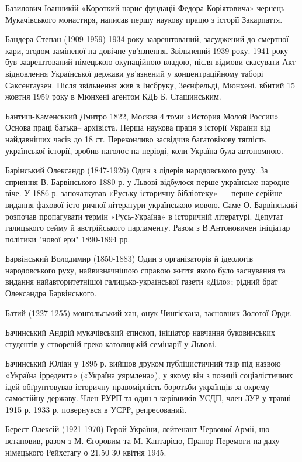 Базилович Іоанникій «Короткий нарис фундації Федора Коріятовича» чернець Мукачівського монастиря, написав першу наукову працю з історії Закарпаття.

Бандера Степан (1909-1959) 1934 року заарештований, засуджений до смертної кари, згодом заміненої на довічне ув'язнення. Звільнений 1939 року. 1941 року був заарештований німецькою окупаційною владою, після відмови скасувати Акт відновлення Української держави ув'язнений у концентраційному таборі Саксенгаузен. Після звільнення жив в Інсбруку, Зеєнфельді, Мюнхені. вбитий 15 жовтня 1959 року в Мюнхені агентом КДБ Б. Сташинським. 

Бантиш-Каменський Дмитро 1822, Москва 4 томи «История Молой России» Основа праці батька– архівіста. Перша наукова праця з історії України від найдавніших часів до 18 ст. Переконливо засвідчив багатовікову тяглість української історії, зробив наголос на періоді, коли Україна була автономною.

Барінський Олександр (1847-1926) Один з лідерів народовського руху. За сприяння В. Барвінського 1880 р. у Львові відбулося перше українське народне віче. У 1886 р. започаткував «Руську історичну бібліотеку» --- перше серійне видання фахової істо ричної літератури українською мовою. Саме О. Барвінський розпочав пропагувати термін «Русь-Україна» в історичній літературі. Депутат галицького сейму й австрійського парламенту. Разом з В.Антоновичен ініціатар політики "нової ери" 1890-1894 рр. 

Барвінський Володимир (1850-1883) Один з організаторів й ідеологів народовського руху, найвизначнішою справою життя якого було заснування та видання найавторитетнішої галицько-української газети «Діло»; рідний брат Олександра Барвінського. 

Батий (1227-1255) монгольський хан, онук Чингісхана, засновник Золотої Орди.

Бачинський Андрій мукачівський єпископ, ініціатор навчання буковинських студентів у створеній греко-католицькій семінарії у Львові.

Бачинський Юліан у 1895 р. вийшов друком публіцистичний твір під назвою «Україна ірредента» («Україна уярмлена»), у якому він з позиції соціалістичних ідей обґрунтовував історичну правомірність боротьби українців за окрему самостійну державу. Член РУРП та один з керівників УСДП, член ЗУР у травні 1915 р. 1933 р. повернувся в УСРР, репресований.

Берест Олексій (1921-1970) Герой України, лейтенант Червоної Армії, що встановив, разом з М. Єгоровим та М. Кантарією, Прапор Перемоги на даху німецького Рейхстагу о 21.50 30 квітня 1945.

